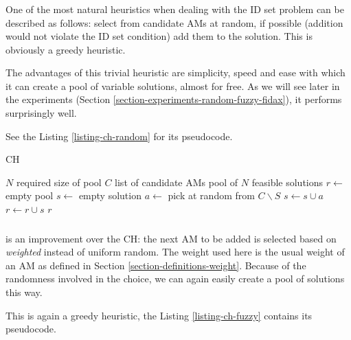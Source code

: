 \subsubsection{}
\label{heu-ch-random}

One of the most natural heuristics when dealing with the ID set problem can be described as follows: select from candidate AMs at random, if possible (addition would not violate the ID set condition) add them to the solution. This is obviously a greedy heuristic.

The advantages of this trivial heuristic are simplicity, speed and ease with which it can create a pool of variable solutions, almost for free. As we will see later in the experiments (Section \ref{section-experiments-random-fuzzy-fidax}), it performs surprisingly well.

See the Listing \ref{listing-ch-random} for its pseudocode.

\begin{algorithm}
\caption{ CH}
\label{listing-ch-random}
\begin{algorithmic}
\REQUIRE $N$ required size of pool
\REQUIRE $C$ list of candidate AMs
\ENSURE pool of $N$ feasible solutions
\STATE $r \gets $ empty pool
  \STATE {}
  \STATE $s \gets $ empty solution
    \STATE $a \gets $ pick at random from $C \backslash S$
    \STATE $s \gets s \cup a$
  \ENDWHILE
  \STATE $r \gets r \cup s$
\ENDFOR
\RETURN $r$
\end{algorithmic}
\end{algorithm}

\subsubsection{}
\label{heu-ch-fuzzy}

 is an improvement over the  CH: the next AM to be added is selected based on \textit{weighted} instead of uniform random. The weight used here is the usual weight of an AM as defined in Section \ref{section-definitions-weight}. Because of the randomness involved in the choice, we can again easily create a pool of solutions this way.

This is again a greedy heuristic, the Listing \ref{listing-ch-fuzzy} contains its pseudocode.

